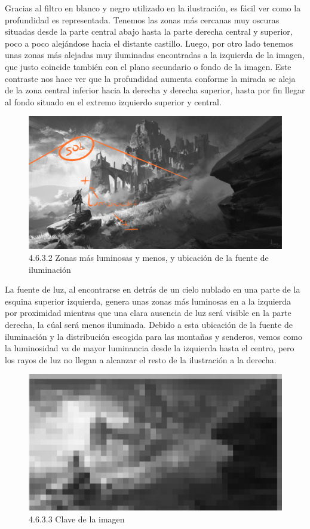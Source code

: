 \documentclass[12pt]{article}
\begin{document}
    Gracias al filtro en blanco y negro utilizado en la ilustración, es fácil ver como la profundidad es representada. Tenemos las zonas más cercanas muy oscuras situadas desde la parte central abajo hasta la parte derecha central y superior, poco a poco alejándose hacia el distante castillo. Luego, por otro lado tenemos unas zonas más alejadas muy iluminadas encontradas a la izquierda de la imagen, que justo coincide también con el plano secundario o fondo de la imagen. Este contraste nos hace ver que la profundidad aumenta conforme la mirada se aleja de la zona central inferior hacia la derecha y derecha superior, hasta por fin llegar al fondo situado en el extremo izquierdo superior y central.

    \begin{figure}[H]
      \centering
      \includegraphics[width=\textwidth]{images/Nerea/Nerea Zelda concept 632.PNG}
      \caption{\small 4.6.3.2 Zonas más luminosas y menos, y ubicación de la fuente de iluminación}
    \end{figure}

    La fuente de luz, al encontrarse en detrás de un cielo nublado en una parte de la esquina superior izquierda, genera unas zonas más luminosas en a la izquierda por proximidad mientras que una clara ausencia de luz será visible en la parte derecha, la cúal será menos iluminada. Debido a esta ubicación de la fuente de iluminación y la distribución escogida para las montañas y senderos, vemos como la luminosidad va de mayor luminancia desde la izquierda hasta el centro, pero los rayos de luz no llegan a alcanzar el resto de la ilustración a la derecha.

    \begin{figure}[H]
      \centering
      \includegraphics[width=\textwidth]{images/Nerea/Nerea Zelda concept 633.PNG}
      \caption{\small 4.6.3.3 Clave de la imagen}
    \end{figure}
\end{document}
